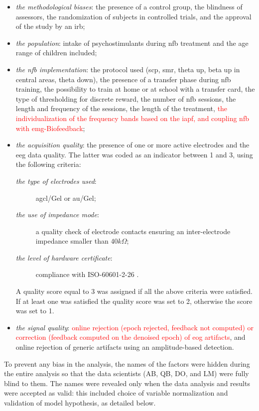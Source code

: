 \begin{itemize}
  \item \emph{the methodological biases}: the presence of a control group, the blindness of assessors, 
  the randomization of subjects in controlled trials, and the approval of the study by an \gls{irb};
  \item \emph{the population}: intake of psychostimulants during \gls{nfb} treatment and the age range of children
  included;
  \item \emph{the \gls{nfb} implementation}: the protocol used (\gls{scp}, \gls{smr}, 
  theta up, beta up in central areas, theta down), the presence of a transfer phase during \gls{nfb} training, the 
	possibility to train at home or at school with a transfer card, 
  the type of thresholding for discrete reward, the number of \gls{nfb} sessions, the length and frequency of the sessions, the length of
  the treatment, \textcolor{red}{the individualization of the frequency bands based on the \gls{iapf}, and coupling \gls{nfb} with \gls{emg}-Biofeedback};
  \item \emph{the acquisition quality}: the presence of one or more active electrodes and the \gls{eeg} data quality. 
  The latter was coded as an indicator between 1 and 3, using the following criteria:   
	\begin{description}
	  \item[\emph{the type of electrodes used}:] \gls{agcl}/Gel or \gls{au}/Gel;
    \item[\emph{the use of impedance mode}:] a quality check of electrode contacts
		ensuring an inter-electrode impedance smaller than $40k\Omega$;  
    \item[\emph{the level of hardware certificate}:] compliance with ISO-60601-2-26 \citep{ISO-60601-2-26:2012}.
	\end{description}
	A quality score equal to 3 was assigned if all the above criteria were satisfied. If at least one was satisfied
	the quality score was set to 2, otherwise the score was set to 1.
  \item \emph{the signal quality}: \textcolor{red}{online rejection (epoch rejected, feedback not computed) or correction (feedback computed on the denoised epoch) of \gls{eog} artifacts},
	and online rejection of generic artifacts using an amplitude-based detection.
\end{itemize}	

To prevent any bias in the analysis, the names of the factors were hidden during the entire analysis so that the data scientists (AB, QB,
DO, and LM) were fully blind to them. The names were revealed only when the data analysis and results were accepted as valid: 
this included choice of variable normalization and validation of model hypothesis, as detailed below.

